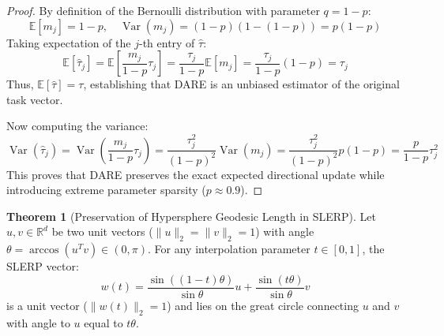 \documentclass[11pt,a4paper]{article}
\theoremstyle{definition}
\newtheorem{theorem}{\textbf{Theorem}}[section]
\begin{document}
\begin{proof}
By definition of the Bernoulli distribution with parameter $q = 1 - p$:
{\boldmath
\begin{equation}
\mathbb{E}[m_j] = 1 - p, \quad \operatorname{Var}(m_j) = (1 - p)(1 - (1 - p)) = p(1 - p)
\end{equation}
}
Taking expectation of the $j$-th entry of $\hat{\tau}$:
{\boldmath
\begin{equation}
\mathbb{E}[\hat{\tau}_j] = \mathbb{E}\left[\frac{m_j}{1 - p} \tau_j\right] = \frac{\tau_j}{1 - p} \mathbb{E}[m_j] = \frac{\tau_j}{1 - p} (1 - p) = \tau_j
\end{equation}
}
Thus, $\mathbb{E}[\hat{\tau}] = \tau$, establishing that DARE is an unbiased estimator of the original task vector.

Now computing the variance:
{\boldmath
\begin{equation}
\operatorname{Var}(\hat{\tau}_j) = \operatorname{Var}\left(\frac{m_j}{1 - p} \tau_j\right) = \frac{\tau_j^2}{(1 - p)^2} \operatorname{Var}(m_j) = \frac{\tau_j^2}{(1 - p)^2} p(1 - p) = \frac{p}{1 - p} \tau_j^2
\end{equation}
}
This proves that DARE preserves the exact expected directional update while introducing extreme parameter sparsity ($p \approx 0.9$).
\end{proof}

\begin{theorem}[Preservation of Hypersphere Geodesic Length in SLERP]
Let $u, v \in \mathbb{R}^d$ be two unit vectors ($\|u\|_2 = \|v\|_2 = 1$) with angle $\theta = \arccos(u^T v) \in (0, \pi)$. For any interpolation parameter $t \in [0, 1]$, the SLERP vector:
{\boldmath
\begin{equation}
w(t) = \frac{\sin((1 - t)\theta)}{\sin \theta} u + \frac{\sin(t\theta)}{\sin \theta} v
\end{equation}
}
is a unit vector ($\|w(t)\|_2 = 1$) and lies on the great circle connecting $u$ and $v$ with angle to $u$ equal to $t\theta$.
\end{theorem}
\end{document}
